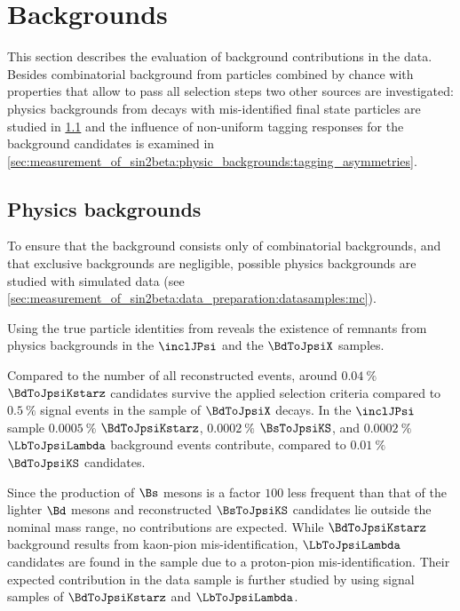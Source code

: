 
\section{Backgrounds}
\label{sec:measurement_of_sin2beta:physic_backgrounds}

This section describes the evaluation of background contributions in the data.
Besides combinatorial background from particles combined by chance with
properties that allow to pass all selection steps two other sources are
investigated: physics backgrounds from decays with mis-identified final state
particles are studied in
\cref{sec:measurement_of_sin2beta:physic_backgrounds:physic_backgrounds} and the
influence of non-uniform tagging responses for the background candidates is
examined in
\cref{sec:measurement_of_sin2beta:physic_backgrounds:tagging_asymmetries}.

\subsection{Physics backgrounds}
\label{sec:measurement_of_sin2beta:physic_backgrounds:physic_backgrounds}

To ensure that the background consists only of combinatorial backgrounds, and
that exclusive backgrounds are negligible, possible physics backgrounds are
studied with simulated data (see
\cref{sec:measurement_of_sin2beta:data_preparation:datasamples:mc}).

Using the true particle identities from \MC reveals the existence of remnants
from physics backgrounds in the $\inclJPsi$ and the $\BdToJpsiX$ \MC samples.

Compared to the number of all reconstructed events, around $\SI{0.04}{\percent}$
$\BdToJpsiKstarz$ candidates survive the applied selection criteria compared to
$\SI{0.5}{\percent}$ signal events in the sample of $\BdToJpsiX$ decays. In the
$\inclJPsi$ sample $\SI{0.0005}{\percent}$ $\BdToJpsiKstarz$,
$\SI{0.0002}{\percent}$ $\BsToJpsiKS$, and $\SI{0.0002}{\percent}$
$\LbToJpsiLambda$ background events contribute, compared to
$\SI{0.01}{\percent}$ $\BdToJpsiKS$ candidates.

Since the production of $\Bs$ mesons is a factor $\num{100}$ less frequent than
that of the lighter $\Bd$ mesons and reconstructed $\BsToJpsiKS$ candidates lie
outside the nominal mass range, no contributions are expected. While
$\BdToJpsiKstarz$ background results from kaon-pion mis-identification,
$\LbToJpsiLambda$ candidates are found in the sample due to a proton-pion
mis-identification. Their expected contribution in the data sample is further
studied by using signal \MC samples of $\BdToJpsiKstarz$ and $\LbToJpsiLambda$.

